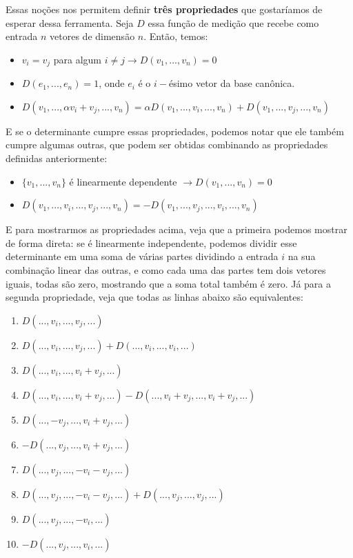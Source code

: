\documentclass[11pt, a4paper]{article}
\begin{document}
Essas noções nos permitem definir \textbf{três propriedades} que gostaríamos de esperar dessa ferramenta. Seja \(D\) essa função de medição que recebe como entrada \(n\) vetores de dimensão \(n\). Então, temos:

\begin{itemize}
    \item \(v_i=v_j\) para algum \(i\ne j \rightarrow D(v_1,...,v_n)=0\)
    \item \(D(e_1,...,e_n)=1\), onde \(e_i\) é o \(i-\)ésimo vetor da base canônica.
    \item \(D(v_1,...,\alpha v_i+v_j,...,v_n)=\alpha D(v_1,...,v_i,...,v_n) + D(v_1,...,v_j,...,v_n)\)
\end{itemize}

E se o determinante cumpre essas propriedades, podemos notar que ele também cumpre algumas outras, que podem ser obtidas combinando as propriedades definidas anteriormente:

\begin{itemize}
    \item \(\{v_1,...,v_n\}\) é linearmente dependente \(\rightarrow D(v_1,...,v_n)=0\)
    \item \(D(v_1,...,v_i,...,v_j,...,v_n)=-D(v_1,...,v_j,...,v_i,...,v_n)\)
\end{itemize}

E para mostrarmos as propriedades acima, veja que a primeira podemos mostrar de forma direta: se é linearmente independente, podemos dividir esse determinante em uma soma de várias partes dividindo a entrada \(i\) na sua combinação linear das outras, e como cada uma das partes tem dois vetores iguais, todas são zero, mostrando que a soma total também é zero. Já para a segunda propriedade, veja que todas as linhas abaixo são equivalentes:
\begin{enumerate}
    \item \(D(...,v_i,...,v_j,...)\)
    \item \(D(...,v_i,...,v_j,...)+D(...,v_i,...,v_i,...)\)
    \item \(D(...,v_i,...,v_i+v_j,...)\)
    \item \(D(...,v_i,...,v_i+v_j,...) - D(...,v_i+v_j,...,v_i+v_j,...)\)
    \item \(D(...,-v_j,...,v_i+v_j,...)\)
    \item \(-D(...,v_j,...,v_i+v_j,...)\)
    \item \(D(...,v_j,...,-v_i-v_j,...)\)
    \item \(D(...,v_j,...,-v_i-v_j,...)+D(...,v_j,...,v_j,...)\)
    \item \(D(...,v_j,...,-v_i,...)\)
    \item \(-D(...,v_j,...,v_i,...)\)
\end{enumerate}
\end{document}
